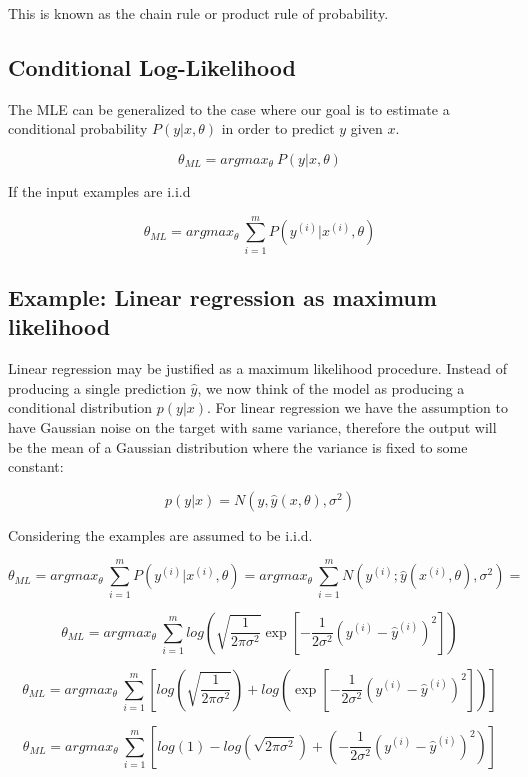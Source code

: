 This is known as the chain rule or product rule of probability.

\subsection{Conditional Log-Likelihood}

The MLE can be generalized to the case where our goal is to estimate a conditional probability $ P (y \vert x, \theta)$
in order to predict $y$ given $x$.

$$\theta_{ML} = argmax_{\theta} ~ P (y \vert x, \theta) $$

\noindent If the input examples are i.i.d

$$\theta_{ML} = argmax_{\theta} ~ \sum_{i=1}^{m} P (y^{(i)} \vert x^{(i)}, \theta) $$

\subsection{Example: Linear regression as maximum likelihood}

Linear regression may be justified as a maximum likelihood procedure. Instead of producing a single prediction $\hat{y}$, we now think of the model as producing a conditional distribution $p(y \vert x)$. For linear regression we have the assumption to have Gaussian noise on the target with same variance, therefore the output will be the mean of a Gaussian distribution where the variance is fixed to some constant:

$$ p(y \vert x) = N(y, \hat{y}(x, \theta), \sigma^2)  $$

\noindent Considering the examples are assumed to be i.i.d.

$$\theta_{ML} = argmax_{\theta} ~ \sum_{i=1}^{m} P (y^{(i)} \vert x^{(i)}, \theta) = argmax_{\theta} ~ \sum_{i=1}^{m} N(y^{(i)}; \hat{y} (x^{(i)}, \theta), \sigma^2) = $$ 

$$ \theta_{ML} = argmax_{\theta} ~ \sum_{i=1}^{m} log \left( \sqrt{\frac{1}{2 \pi \sigma^2}}  \exp{\left[ -\frac{1}{2 \sigma^2} (y^{(i)} - \hat{y}^{(i)})^2  \right]}  \right) $$

$$ \theta_{ML} = argmax_{\theta} ~ \sum_{i=1}^{m} \left[ log \left( \sqrt{\frac{1}{2 \pi \sigma^2}} \right) + log \left(  \exp{\left[ -\frac{1}{2 \sigma^2} (y^{(i)} - \hat{y}^{(i)})^2  \right]}  \right)  \right] $$

$$ \theta_{ML} = argmax_{\theta} ~ \sum_{i=1}^{m} \left[ log (1) - log \left( \sqrt{2 \pi \sigma^2} \right) + \left( -\frac{1}{2 \sigma^2} (y^{(i)} - \hat{y}^{(i)})^2  \right)  \right] $$

